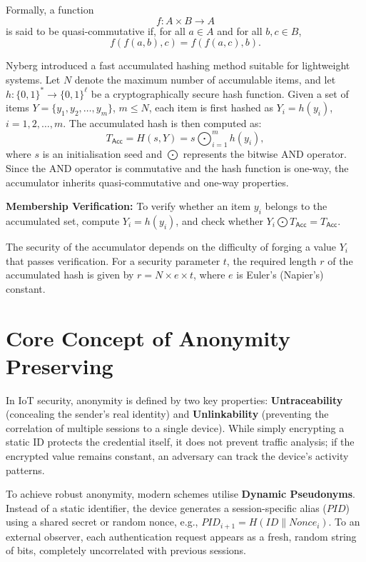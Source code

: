 \documentclass[12pt,a4paper]{report}
\begin{document}
Formally, a function
\[
  f : A \times B \to A
\]
is said to be quasi-commutative if, for all $a \in A$ and for all $b, c \in B$,
\begin{equation}
  f(f(a,b),c) = f(f(a,c),b).
\end{equation}

Nyberg introduced a fast accumulated hashing method suitable for lightweight systems.
Let $N$ denote the maximum number of accumulable items, and let
$h : \{0,1\}^* \to \{0,1\}^\ell$ be a cryptographically secure hash function.
Given a set of items $Y = \{y_1, y_2, \ldots, y_m\}$, $m \le N$, each item is
first hashed as $Y_i = h(y_i)$, $i = 1, 2, \ldots, m$.
The accumulated hash is then computed as:
\begin{equation}
  T_{\mathsf{Acc}} = H(s, Y) = s \bigodot_{i=1}^{m} h(y_i),
\end{equation}
where $s$ is an initialisation seed and $\bigodot$ represents the bitwise AND
operator.
Since the AND operator is commutative and the hash function is one-way, the
accumulator inherits quasi-commutative and one-way properties.

\textbf{Membership Verification:} To verify whether an item $y_i$ belongs to the
accumulated set, compute $Y_i = h(y_i)$, and check whether
$Y_i \bigodot T_{\mathsf{Acc}} = T_{\mathsf{Acc}}$.

The security of the accumulator depends on the difficulty of forging a value $Y_i$
that passes verification.
For a security parameter $t$, the required length $r$ of the accumulated hash is
given by $r = N \times e \times t$, where $e$ is Euler's (Napier's) constant.

\section{Core Concept of Anonymity Preserving}

In IoT security, anonymity is defined by two key properties:
\textbf{Untraceability} (concealing the sender's real identity) and
\textbf{Unlinkability} (preventing the correlation of multiple sessions to a single
device).
While simply encrypting a static ID protects the credential itself, it does not
prevent traffic analysis; if the encrypted value remains constant, an adversary can
track the device's activity patterns.

To achieve robust anonymity, modern schemes utilise \textbf{Dynamic Pseudonyms}.
Instead of a static identifier, the device generates a session-specific alias
($\mathit{PID}$) using a shared secret or random nonce, e.g.,
$\mathit{PID}_{i+1} = H(\mathit{ID} \| \mathit{Nonce}_i)$.
To an external observer, each authentication request appears as a fresh, random
string of bits, completely uncorrelated with previous sessions.
\end{document}
